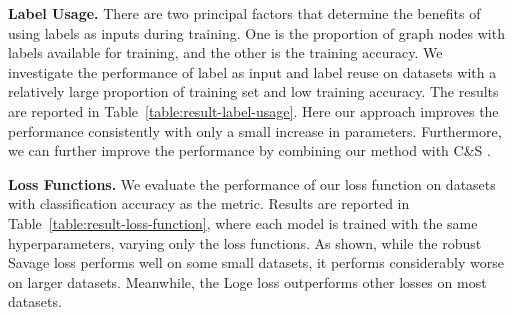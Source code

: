 \documentclass[sigconf,screen,nonacm]{acmart} \usepackage{booktabs}
\newcommand{\minisection}[1]{\vspace{5pt}\noindent\textbf{#1.}}
\newcommand{\lossname}{{Loge }}
\begin{document}
	\minisection{Label Usage}
	There are two principal factors that determine the benefits of using labels as inputs during training. One is the proportion of graph nodes with labels available for training, and the other is the training accuracy. We investigate the performance of label as input and label reuse on datasets with a relatively large proportion of training set and low training accuracy. The results are reported in Table~\ref{table:result-label-usage}. Here our approach improves the performance consistently with only a small increase in parameters. Furthermore, we can further improve the performance by combining our method with C\&S \citep{huang2020combining}.
	
	\minisection{Loss Functions}
	We evaluate the performance of our loss function on datasets with classification accuracy as the metric. Results are reported in Table~\ref{table:result-loss-function}, where each model is trained with the same hyperparameters, varying only the loss functions.
	As shown, while the robust Savage loss performs well on some small datasets, it performs considerably worse on larger datasets.
	Meanwhile, the \lossname loss outperforms other losses on most datasets.
	
\end{document}
